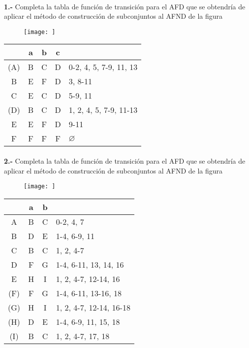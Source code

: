 \documentclass[11pt,a4paper]{report}
\begin{document}
\paragraph{}

\paragraph{}
\textbf{1.-} Completa la tabla de función de transición para el AFD que se obtendría de aplicar el método de construcción de subconjuntos al AFND de la figura
\begin{figure}[ht!]
\centering
\texttt{[image: ]}
\end{figure}

\begin{tabular} {| c | c |c |c | l |}
\hline 
& a & b & c & \\ \hline
(A) & B & C & D & 0-2, 4, 5, 7-9, 11, 13\\ \hline
B & E & F & D & 3, 8-11\\ \hline
C & E & C & D & 5-9, 11\\ \hline
(D) & B & C & D & 1, 2, 4, 5, 7-9, 11-13\\ \hline
E & E & F & D & 9-11\\ \hline
F & F & F & F & $\varnothing$\\ \hline
\end{tabular}\paragraph{}
\textbf{2.-} Completa la tabla de función de transición para el AFD que se obtendría de aplicar el método de construcción de subconjuntos al AFND de la figura
\begin{figure}[ht!]
\centering
\texttt{[image: ]}
\end{figure}

\begin{tabular} {| c | c |c | l |}
\hline 
& a & b & \\ \hline
A & B & C & 0-2, 4, 7\\ \hline
B & D & E & 1-4, 6-9, 11\\ \hline
C & B & C & 1, 2, 4-7\\ \hline
D & F & G & 1-4, 6-11, 13, 14, 16\\ \hline
E & H & I & 1, 2, 4-7, 12-14, 16\\ \hline
(F) & F & G & 1-4, 6-11, 13-16, 18\\ \hline
(G) & H & I & 1, 2, 4-7, 12-14, 16-18\\ \hline
(H) & D & E & 1-4, 6-9, 11, 15, 18\\ \hline
(I) & B & C & 1, 2, 4-7, 17, 18\\ \hline
\end{tabular}
\end{document}
